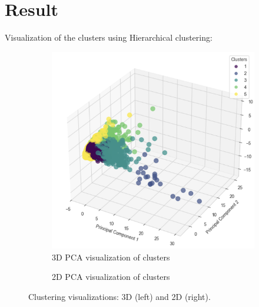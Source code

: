 \section{Result}
Visualization of the clusters using Hierarchical clustering:

\begin{figure}[H]
    \centering
    \begin{subfigure}[b]{0.45\textwidth}
        \centering
        \includegraphics[width=\textwidth]{src/figs/3d_PCA_HC.png}
        \caption{3D PCA visualization of clusters}
        \label{fig:3D_pca}
    \end{subfigure}
    \hfill
    \begin{subfigure}[b]{0.45\textwidth}
        \centering
        \caption{2D PCA visualization of clusters}
        \label{fig:PCA_2d}
    \end{subfigure}
    \caption{Clustering visualizations: 3D (left) and 2D (right).}
    \label{fig:comparison1}
\end{figure}

